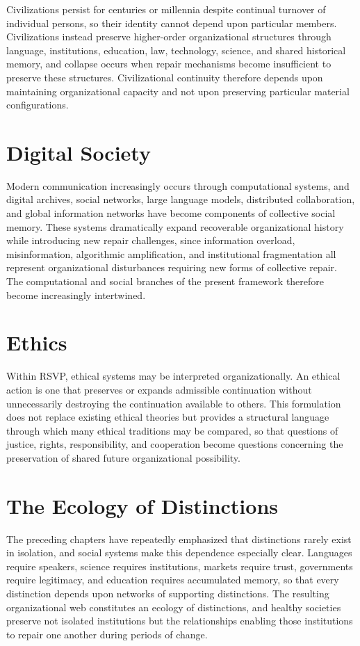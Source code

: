 \documentclass[11pt,oneside]{book}
\numberwithin{equation}{chapter}
\theoremstyle{definition}
\theoremstyle{plain}
\begin{document}
Civilizations persist for centuries or millennia despite continual turnover of individual persons, so their identity cannot depend upon particular members. Civilizations instead preserve higher-order organizational structures through language, institutions, education, law, technology, science, and shared historical memory, and collapse occurs when repair mechanisms become insufficient to preserve these structures. Civilizational continuity therefore depends upon maintaining organizational capacity and not upon preserving particular material configurations.

\section{Digital Society}

Modern communication increasingly occurs through computational systems, and digital archives, social networks, large language models, distributed collaboration, and global information networks have become components of collective social memory. These systems dramatically expand recoverable organizational history while introducing new repair challenges, since information overload, misinformation, algorithmic amplification, and institutional fragmentation all represent organizational disturbances requiring new forms of collective repair. The computational and social branches of the present framework therefore become increasingly intertwined.

\section{Ethics}

Within RSVP, ethical systems may be interpreted organizationally. An ethical action is one that preserves or expands admissible continuation without unnecessarily destroying the continuation available to others. This formulation does not replace existing ethical theories but provides a structural language through which many ethical traditions may be compared, so that questions of justice, rights, responsibility, and cooperation become questions concerning the preservation of shared future organizational possibility.

\section{The Ecology of Distinctions}

The preceding chapters have repeatedly emphasized that distinctions rarely exist in isolation, and social systems make this dependence especially clear. Languages require speakers, science requires institutions, markets require trust, governments require legitimacy, and education requires accumulated memory, so that every distinction depends upon networks of supporting distinctions. The resulting organizational web constitutes an ecology of distinctions, and healthy societies preserve not isolated institutions but the relationships enabling those institutions to repair one another during periods of change.
\end{document}
